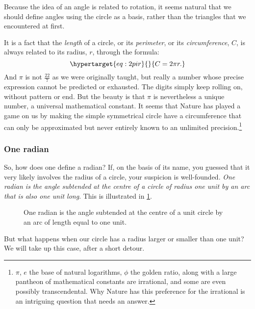 \documentclass[
  a4paper,
]{article}
\begin{document}
Because the idea of an angle is related to rotation, it seems natural
that we should define angles using the circle as a basis, rather than
the triangles that we encountered at first.

It is a fact that the \emph{length} of a circle, or its
\emph{perimeter}, or its \emph{circumference}, \(C\), is always related
to its radius, \(r\), through the formula:
\begin{equation}\protect\hypertarget{eq:2pir}{}{
C = 2\pi r.
}\label{eq:2pir}\end{equation} And \(\pi\) is not \(\frac{22}{7}\) as we
were originally taught, but really a number whose precise expression
cannot be predicted or exhausted. The digits simply keep rolling on,
without pattern or end. But the beauty is that \(\pi\) is nevertheless a
unique number, a universal mathematical constant. It seems that Nature
has played a game on us by making the simple symmetrical circle have a
circumference that can only be approximated but never entirely known to
an unlimited precision.\footnote{\(\pi\), \(e\) the base of natural
  logarithms, \(\phi\) the golden ratio, along with a large pantheon of
  mathematical constants are irrational, and some are even possibly
  transcendental. Why Nature has this preference for the irrational is
  an intriguing question that needs an answer.}

\hypertarget{one-radian}{%
\subsubsection{One radian}\label{one-radian}}

So, how does one define a radian? If, on the basis of its name, you
guessed that it very likely involves the radius of a circle, your
suspicion is well-founded. \emph{One radian is the angle subtended at
the centre of a circle of radius one unit by an arc that is also one
unit long}. This is illustrated in \cref{fig:radian}.

\begin{figure}
\hypertarget{fig:radian}{%
\centering

\caption{One radian is the angle subtended at the centre of a unit
circle by an arc of length equal to one unit.}\label{fig:radian}
}
\end{figure}

But what happens when our circle has a radius larger or smaller than one
unit? We will take up this case, after a short detour.
\end{document}
